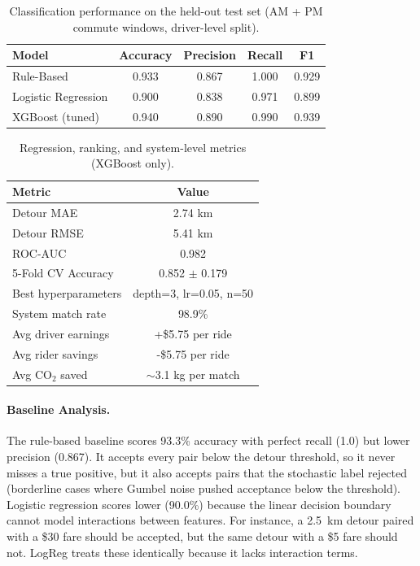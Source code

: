 \documentclass{article}
\begin{document}
\begin{table}[h]
\caption{Classification performance on the held-out test set (AM + PM commute windows, driver-level split).}
\label{tab:results}
\centering
\footnotesize
\begin{tabular}{@{}lcccc@{}}
\toprule
Model & Accuracy & Precision & Recall & F1 \\
\midrule
Rule-Based & 0.933 & 0.867 & 1.000 & 0.929 \\
Logistic Regression & 0.900 & 0.838 & 0.971 & 0.899 \\
XGBoost (tuned) & 0.940 & 0.890 & 0.990 & 0.939 \\
\bottomrule
\end{tabular}
\end{table}

\begin{table}[h]
\caption{Regression, ranking, and system-level metrics (XGBoost only).}
\label{tab:regression}
\centering
\footnotesize
\begin{tabular}{@{}lc@{}}
\toprule
Metric & Value \\
\midrule
Detour MAE & 2.74 km \\
Detour RMSE & 5.41 km \\
ROC-AUC & 0.982 \\
5-Fold CV Accuracy & 0.852 $\pm$ 0.179 \\
Best hyperparameters & depth=3, lr=0.05, n=50 \\
\midrule
System match rate & 98.9\% \\
Avg driver earnings & +\$5.75 per ride \\
Avg rider savings & -\$5.75 per ride \\
Avg CO$_2$ saved & $\sim$3.1 kg per match \\
\bottomrule
\end{tabular}
\end{table}

\paragraph{Baseline Analysis.}
The rule-based baseline scores 93.3\% accuracy with perfect recall (1.0) but lower precision (0.867). It accepts every pair below the detour threshold, so it never misses a true positive, but it also accepts pairs that the stochastic label rejected (borderline cases where Gumbel noise pushed acceptance below the threshold). Logistic regression scores lower (90.0\%) because the linear decision boundary cannot model interactions between features. For instance, a 2.5~km detour paired with a \$30 fare should be accepted, but the same detour with a \$5 fare should not. LogReg treats these identically because it lacks interaction terms.
\end{document}
